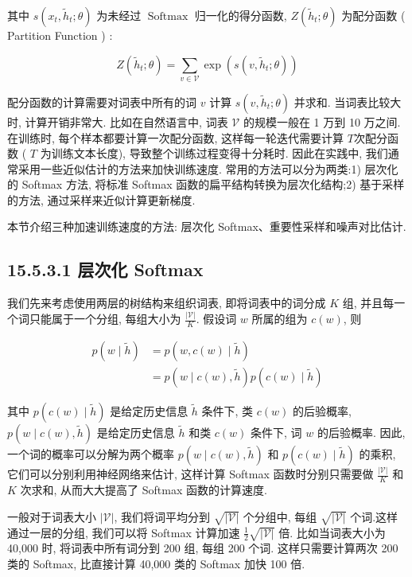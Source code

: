 \documentclass[10pt]{article}
\begin{document}
其中 $s\left(x_{t}, \tilde{h}_{t} ; \theta\right)$ 为未经过 $\operatorname{Softmax}$ 归一化的得分函数, $Z\left(\tilde{h}_{t} ; \theta\right)$ 为配分函数 ( Partition Function ) :


\begin{equation*}
Z\left(\tilde{h}_{t} ; \theta\right)=\sum_{v \in \mathcal{V}} \exp \left(s\left(v, \tilde{h}_{t} ; \theta\right)\right) \tag{15.50}
\end{equation*}


配分函数的计算需要对词表中所有的词 $v$ 计算 $s\left(v, \tilde{h}_{t} ; \theta\right)$ 并求和. 当词表比较大时, 计算开销非常大. 比如在自然语言中, 词表 $\mathcal{V}$ 的规模一般在 1 万到 10 万之间. 在训练时, 每个样本都要计算一次配分函数, 这样每一轮迭代需要计算 $T$次配分函数 ( $T$ 为训练文本长度), 导致整个训练过程变得十分耗时. 因此在实践中, 我们通常采用一些近似估计的方法来加快训练速度. 常用的方法可以分为两类:1) 层次化的 Softmax 方法, 将标准 Softmax 函数的扁平结构转换为层次化结构;2) 基于采样的方法, 通过采样来近似计算更新梯度.

本节介绍三种加速训练速度的方法: 层次化 Softmax、重要性采样和噪声对比估计.

\subsection*{15.5.3.1 层次化 Softmax}
我们先来考虑使用两层的树结构来组织词表, 即将词表中的词分成 $K$ 组, 并且每一个词只能属于一个分组, 每组大小为 $\frac{|\mathcal{V}|}{K}$. 假设词 $w$ 所属的组为 $c(w)$, 则


\begin{align*}
p(w \mid \tilde{h}) & =p(w, c(w) \mid \tilde{h})  \tag{15.51}\\
& =p(w \mid c(w), \tilde{h}) p(c(w) \mid \tilde{h}) \tag{15.52}
\end{align*}


其中 $p(c(w) \mid \tilde{h})$ 是给定历史信息 $\tilde{h}$ 条件下, 类 $c(w)$ 的后验概率, $p(w \mid c(w), \tilde{h})$ 是给定历史信息 $\tilde{h}$ 和类 $c(w)$ 条件下, 词 $w$ 的后验概率. 因此,一个词的概率可以分解为两个概率 $p(w \mid c(w), \tilde{h})$ 和 $p(c(w) \mid \tilde{h})$ 的乘积, 它们可以分别利用神经网络来估计, 这样计算 Softmax 函数时分别只需要做 $\frac{|\mathcal{V}|}{K}$ 和 $K$ 次求和, 从而大大提高了 Softmax 函数的计算速度.

一般对于词表大小 $|\mathcal{V}|$, 我们将词平均分到 $\sqrt{|\mathcal{V}|}$ 个分组中, 每组 $\sqrt{|\mathcal{V}|}$ 个词.这样通过一层的分组, 我们可以将 Softmax 计算加速 $\frac{1}{2} \sqrt{|\mathcal{V}|}$ 倍. 比如当词表大小为 40,000 时, 将词表中所有词分到 200 组, 每组 200 个词. 这样只需要计算两次 200 类的 Softmax, 比直接计算 40,000 类的 Softmax 加快 100 倍.
\end{document}
